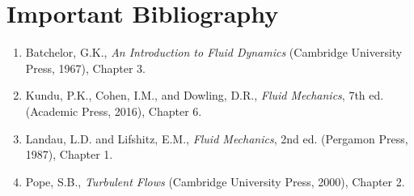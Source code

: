 \section*{Important Bibliography}

\begin{enumerate}
\item Batchelor, G.K., \textit{An Introduction to Fluid Dynamics} (Cambridge University Press, 1967), Chapter 3.
\item Kundu, P.K., Cohen, I.M., and Dowling, D.R., \textit{Fluid Mechanics}, 7th ed. (Academic Press, 2016), Chapter 6.
\item Landau, L.D. and Lifshitz, E.M., \textit{Fluid Mechanics}, 2nd ed. (Pergamon Press, 1987), Chapter 1.
\item Pope, S.B., \textit{Turbulent Flows} (Cambridge University Press, 2000), Chapter 2.
\end{enumerate}

